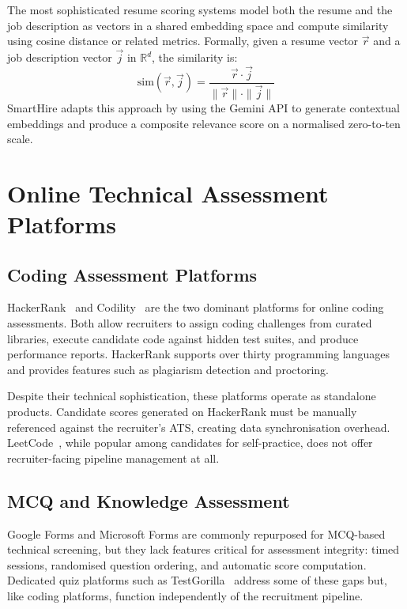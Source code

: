 The most sophisticated resume scoring systems model both the resume and the job description as vectors in a shared embedding space and compute similarity using cosine distance or related metrics. Formally, given a resume vector $\vec{r}$ and a job description vector $\vec{j}$ in $\mathbb{R}^d$, the similarity is:
\begin{equation}
\label{eq:cosine}
\text{sim}(\vec{r}, \vec{j}) = \frac{\vec{r} \cdot \vec{j}}{\|\vec{r}\| \cdot \|\vec{j}\|}
\end{equation}
SmartHire adapts this approach by using the Gemini API to generate contextual embeddings and produce a composite relevance score on a normalised zero-to-ten scale.

\section{Online Technical Assessment Platforms}
\label{sec:assessment-review}

\subsection{Coding Assessment Platforms}

HackerRank~\cite{hackerrank2024} and Codility~\cite{codility2024} are the two dominant platforms for online coding assessments. Both allow recruiters to assign coding challenges from curated libraries, execute candidate code against hidden test suites, and produce performance reports. HackerRank supports over thirty programming languages and provides features such as plagiarism detection and proctoring.

Despite their technical sophistication, these platforms operate as standalone products. Candidate scores generated on HackerRank must be manually referenced against the recruiter's ATS, creating data synchronisation overhead. LeetCode~\cite{leetcode2024}, while popular among candidates for self-practice, does not offer recruiter-facing pipeline management at all.

\subsection{MCQ and Knowledge Assessment}

Google Forms and Microsoft Forms are commonly repurposed for MCQ-based technical screening, but they lack features critical for assessment integrity: timed sessions, randomised question ordering, and automatic score computation. Dedicated quiz platforms such as TestGorilla~\cite{testgorilla2024} address some of these gaps but, like coding platforms, function independently of the recruitment pipeline.

